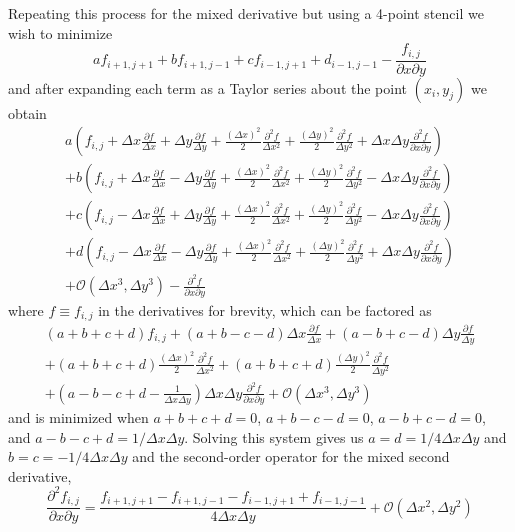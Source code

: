 \documentclass[11pt]{article}
\begin{document}
Repeating this process for the mixed derivative but using a 4-point stencil we wish to minimize
\begin{displaymath}
  af_{i+1,j+1} + bf_{i+1,j-1} + cf_{i-1,j+1} + d_{i-1,j-1} - \frac{f_{i,j}}{\partial x \partial y}
\end{displaymath}
and after expanding each term as a Taylor series about the point $(x_i, y_j)$ we obtain
\begin{multline*}
a \left(
  f_{i,j}
  + \Delta x \frac{\partial f}{\Delta x}
  + \Delta y \frac{\partial f}{\Delta y}
  + \frac{(\Delta x)^2}{2} \frac{\partial^2 f}{\Delta x^2}
  + \frac{(\Delta y)^2}{2} \frac{\partial^2 f}{\Delta y^2}
  + \Delta x \Delta y \frac{\partial^2 f}{\partial x \partial y}
  \right) \\
+ b \left(
f_{i,j}
+ \Delta x \frac{\partial f}{\Delta x}
- \Delta y \frac{\partial f}{\Delta y}
+ \frac{(\Delta x)^2}{2} \frac{\partial^2 f}{\Delta x^2}
+ \frac{(\Delta y)^2}{2} \frac{\partial^2 f}{\Delta y^2}
- \Delta x \Delta y \frac{\partial^2 f}{\partial x \partial y}
\right) \\
+ c \left(
f_{i,j}
- \Delta x \frac{\partial f}{\Delta x}
+ \Delta y \frac{\partial f}{\Delta y}
+ \frac{(\Delta x)^2}{2} \frac{\partial^2 f}{\Delta x^2}
+ \frac{(\Delta y)^2}{2} \frac{\partial^2 f}{\Delta y^2}
- \Delta x \Delta y \frac{\partial^2 f}{\partial x \partial y}
\right) \\
+ d \left(
f_{i,j}
- \Delta x \frac{\partial f}{\Delta x}
- \Delta y \frac{\partial f}{\Delta y}
+ \frac{(\Delta x)^2}{2} \frac{\partial^2 f}{\Delta x^2}
+ \frac{(\Delta y)^2}{2} \frac{\partial^2 f}{\Delta y^2}
+ \Delta x \Delta y \frac{\partial^2 f}{\partial x \partial y}
\right) \\
+ \mathcal{O}(\Delta x^3, \Delta y^3) - \frac{\partial^2 f}{\partial x \partial y}
\end{multline*}
where $f \equiv f_{i,j}$ in the derivatives for brevity, which can be factored as
\begin{multline*}
(a + b + c + d)f_{i,j}
  + (a + b - c - d) \Delta x \frac{\partial f}{\Delta x}
  + (a - b + c - d) \Delta y \frac{\partial f}{\Delta y} \\
  + (a + b + c + d) \frac{(\Delta x)^2}{2} \frac{\partial^2 f}{\Delta x^2}
  + (a + b + c + d) \frac{(\Delta y)^2}{2} \frac{\partial^2 f}{\Delta y^2} \\
  + \left(a - b - c + d - \frac{1}{\Delta x \Delta y} \right) \Delta x \Delta y \frac{\partial^2 f}{\partial x \partial y} + \mathcal{O}(\Delta x^3, \Delta y^3)
\end{multline*}
and is minimized when $a+b+c+d=0$, $a+b-c-d=0$, $a-b+c-d=0$, and $a-b-c+d=1/\Delta x \Delta y$. Solving this system gives us $a = d = 1/4\Delta x \Delta y$ and $b = c = -1/4\Delta x \Delta y$ and the second-order operator for the mixed second derivative,
\begin{equation}
\frac{\partial^2 f_{i,j}}{\partial x \partial y} = \frac{f_{i+1,j+1} - f_{i+1,j-1} - f_{i-1,j+1} + f_{i-1,j-1}}{4\Delta x \Delta y} + \mathcal{O}(\Delta x^2, \Delta y^2)
\end{equation}
\end{document}
